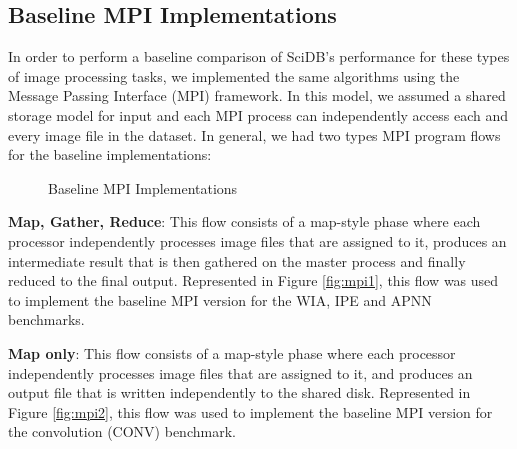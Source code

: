 \documentclass[letterpaper,twocolumn,10pt]{article}
\begin{document}
\subsection{Baseline MPI Implementations}
In order to perform a baseline comparison of SciDB's performance for these types of image processing tasks, we implemented the same algorithms using the Message Passing Interface (MPI) framework. In this model, we assumed a shared storage model for input and each MPI process can independently access each and every image file in the dataset. In general, we had two types MPI program flows for the baseline implementations:


\begin{figure}[ht]
\centering
	 \hspace{1 em}
	\caption{Baseline MPI Implementations}
	\label{fig:mpi}
\end{figure}

\textbf{Map, Gather, Reduce}: This flow consists of a map-style phase where each processor independently processes image files that are assigned to it, produces an intermediate result that is then gathered on the master process and finally reduced to the final output. Represented in Figure \ref{fig:mpi1}, this flow was used to implement the baseline MPI version for the WIA, IPE and APNN benchmarks. 

\textbf{Map only}: This flow consists of a map-style phase where each processor independently processes image files that are assigned to it,  and produces an output file that is written independently to the shared disk. Represented in Figure \ref{fig:mpi2}, this flow was used to implement the baseline MPI version for the convolution (CONV) benchmark. 
\end{document}
